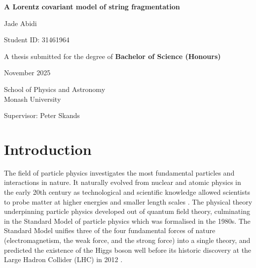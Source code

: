 \documentclass[12pt,a4paper]{report}
\begin{document}
\begin{titlepage}
  \centering
  \vspace*{2cm}
  {\LARGE\bfseries A Lorentz covariant model of string fragmentation \par}
  \vspace{1.5cm}
  \Large Jade Abidi \par
  \vspace{0.5cm}
  \large Student ID: 31461964 \par
  \vspace{0.5cm}
  {\large A thesis submitted for the degree of \bfseries{Bachelor of Science (Honours)}} \par
  \vspace{0.5cm}
  \large November 2025 \par
  \vspace{0.5cm}
  \vfill
  \large School of Physics and Astronomy \\ Monash University \par
  \vspace{0.5cm}
  \large Supervisor: Peter Skands \par
  \vfill
\end{titlepage}

\pagebreak

\begin{abstract}
Monte Carlo event generators are extensively used to simulate high-energy particle-collision events. For analytically intractable aspects, they rely on phenomenological models. The so-called Lund model describes the non-perturbative hadronisation process as the fragmentation of a classical string with constant tension. Lorentz covariance then implies the self-similarity of this fragmentation process along the string. The current formulaion of the Lund model, used in the PYTHIA generator, violates this property in terms of both kinematic distributions and hadronic chemistry. We introduce an additional tunable parameter and a new algorithm for string fragmentation that improve or resolve these issues, albeit with some limitations.
\end{abstract}

\pagebreak

\tableofcontents

\chapter{Introduction}
The field of particle physics investigates the most fundamental particles and interactions in nature. It naturally evolved from nuclear and atomic physics in the early 20th century as technological and scientific knowledge allowed scientists to probe matter at higher energies and smaller length scales \cite{navas_review_2024,Gross:2022hyw}. The physical theory underpinning particle physics developed out of quantum field theory, culminating in the Standard Model of particle physics which was formalised in the 1980s. The Standard Model unifies three of the four fundamental forces of nature (electromagnetism, the weak force, and the strong force) into a single theory, and predicted the existence of the Higgs boson well before its historic discovery at the Large Hadron Collider (LHC) in 2012 \cite{schwartz_quantum_2014,atlas_observation_2012}.
\end{document}
